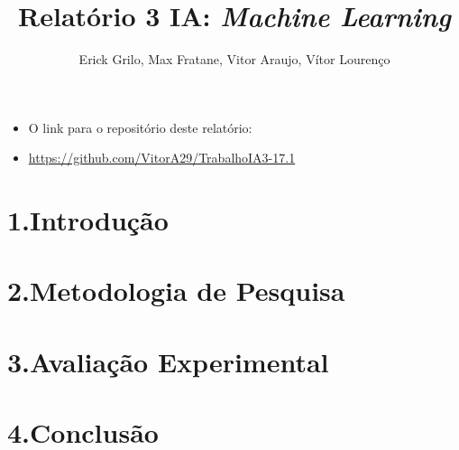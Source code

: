 \documentclass[12pt]{article}
\title{Relatório 3 IA: \textit{Machine Learning}}
\author{Erick Grilo\inst{1}, Max Fratane\inst{1}, Vitor Araujo\inst{1}, Vítor Lourenço\inst{1}}
\begin{document}
 

\maketitle

\begin{itemize}
	\item[] O link para o repositório deste relatório:
	\item[] \url{https://github.com/VitorA29/TrabalhoIA3-17.1}
\end{itemize}


\section{1.\quad Introdução}


\section{2.\quad Metodologia de Pesquisa}


\section{3.\quad Avaliação Experimental}


\section{4.\quad Conclusão}




\end{document}
